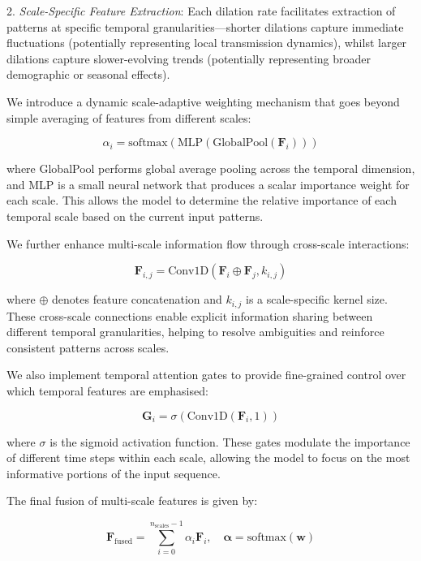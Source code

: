 \documentclass[lettersize, journal]{IEEEtran}
\begin{document}
2. \textit{Scale-Specific Feature Extraction}: Each dilation rate facilitates extraction of patterns at specific temporal granularities—shorter dilations capture immediate fluctuations (potentially representing local transmission dynamics), whilst larger dilations capture slower-evolving trends (potentially representing broader demographic or seasonal effects).

We introduce a dynamic scale-adaptive weighting mechanism that goes beyond simple averaging of features from different scales:

\begin{equation}
\alpha_i = \text{softmax}(\text{MLP}(\text{GlobalPool}(\mathbf{F}_i)))
\end{equation}

where GlobalPool performs global average pooling across the temporal dimension, and MLP is a small neural network that produces a scalar importance weight for each scale. This allows the model to determine the relative importance of each temporal scale based on the current input patterns.

We further enhance multi-scale information flow through cross-scale interactions:

\begin{equation}
\mathbf{F}_{i,j} = \text{Conv1D}(\mathbf{F}_i \oplus \mathbf{F}_j, k_{i,j})
\end{equation}

where $\oplus$ denotes feature concatenation and $k_{i,j}$ is a scale-specific kernel size. These cross-scale connections enable explicit information sharing between different temporal granularities, helping to resolve ambiguities and reinforce consistent patterns across scales.

We also implement temporal attention gates to provide fine-grained control over which temporal features are emphasised:

\begin{equation}
\mathbf{G}_i = \sigma(\text{Conv1D}(\mathbf{F}_i, 1))
\end{equation}

where $\sigma$ is the sigmoid activation function. These gates modulate the importance of different time steps within each scale, allowing the model to focus on the most informative portions of the input sequence.

The final fusion of multi-scale features is given by:

\begin{equation}
\mathbf{F}_{\text{fused}} = \sum_{i=0}^{n_{\text{scales}}-1} \alpha_i \mathbf{F}_i, \quad \boldsymbol{\alpha} = \text{softmax}(\mathbf{w})
\end{equation}
\end{document}
